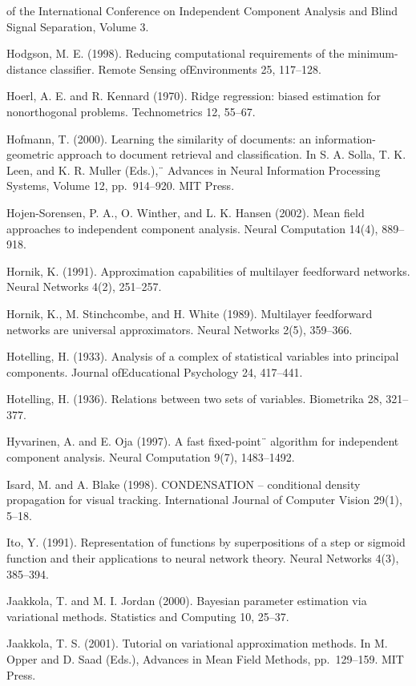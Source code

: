 \documentclass[
  10
]{article}
\begin{document}
of the International Conference on Independent Component Analysis and
Blind Signal Separation, Volume 3.

Hodgson, M. E. (1998). Reducing computational requirements of the
minimum-distance classifier. Remote Sensing ofEnvironments 25, 117--128.

Hoerl, A. E. and R. Kennard (1970). Ridge regression: biased estimation
for nonorthogonal problems. Technometrics 12, 55--67.

Hofmann, T. (2000). Learning the similarity of documents: an
information-geometric approach to document retrieval and classification.
In S. A. Solla, T. K. Leen, and K. R. Muller (Eds.),¨ Advances in Neural
Information Processing Systems, Volume 12, pp.~914--920. MIT Press.

Hojen-Sorensen, P. A., O. Winther, and L. K. Hansen (2002). Mean field
approaches to independent component analysis. Neural Computation 14(4),
889--918.

Hornik, K. (1991). Approximation capabilities of multilayer feedforward
networks. Neural Networks 4(2), 251--257.

Hornik, K., M. Stinchcombe, and H. White (1989). Multilayer feedforward
networks are universal approximators. Neural Networks 2(5), 359--366.

Hotelling, H. (1933). Analysis of a complex of statistical variables
into principal components. Journal ofEducational Psychology 24,
417--441.

Hotelling, H. (1936). Relations between two sets of variables.
Biometrika 28, 321--377.

Hyvarinen, A. and E. Oja (1997). A fast fixed-point¨ algorithm for
independent component analysis. Neural Computation 9(7), 1483--1492.

Isard, M. and A. Blake (1998). CONDENSATION -- conditional density
propagation for visual tracking. International Journal of Computer
Vision 29(1), 5--18.

Ito, Y. (1991). Representation of functions by superpositions of a step
or sigmoid function and their applications to neural network theory.
Neural Networks 4(3), 385--394.

Jaakkola, T. and M. I. Jordan (2000). Bayesian parameter estimation via
variational methods. Statistics and Computing 10, 25--37.

Jaakkola, T. S. (2001). Tutorial on variational approximation methods.
In M. Opper and D. Saad (Eds.), Advances in Mean Field Methods,
pp.~129--159. MIT Press.
\end{document}
